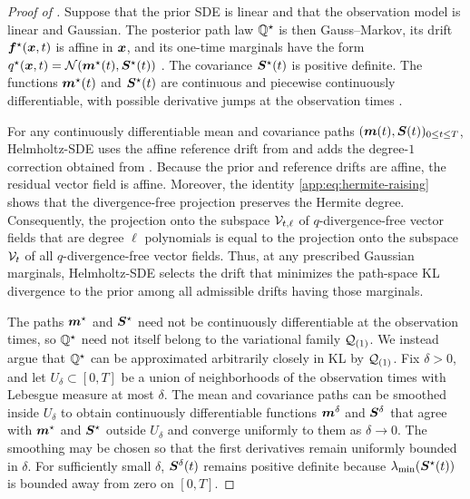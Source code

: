 \begin{proof}[Proof of ]
Suppose that the prior SDE is linear and that the observation model is linear and Gaussian.
The posterior path law $\mathbb{Q}^\star$ is then Gauss--Markov, its drift $\boldsymbol{f}^\star(\boldsymbol{x},t)$ is affine in $\boldsymbol{x}$, and its one-time marginals have the form $q^\star(\boldsymbol{x},t)=\mathcal{N}(\boldsymbol{m}^\star(t),\boldsymbol{S}^\star(t))$ \citep{kalman1961new,sarkka2023bayesian}.
The covariance $\boldsymbol{S}^\star(t)$ is positive definite.
The functions $\boldsymbol{m}^\star(t)$ and $\boldsymbol{S}^\star(t)$ are continuous and piecewise continuously differentiable, with possible derivative jumps at the observation times \citep[Appendix J]{hu2025sing}.

For any continuously differentiable mean and covariance paths $(\boldsymbol{m}(t),\boldsymbol{S}(t))_{0\leq t\leq T}$, Helmholtz-SDE uses the affine reference drift from  and adds the degree-$1$ correction obtained from .
Because the prior and reference drifts are affine, the residual vector field is affine.
Moreover, the identity \cref{app:eq:hermite-raising} shows that the divergence-free projection preserves the Hermite degree.
Consequently, the projection onto the subspace $\mathcal{V}_{t, \ell}$ of $q$-divergence-free vector fields that are degree $\ell$ polynomials is equal to the projection onto the subspace $\mathcal{V}_t$ of all $q$-divergence-free vector fields.
Thus, at any prescribed Gaussian marginals, Helmholtz-SDE selects the drift that minimizes the path-space KL divergence to the prior among all admissible drifts having those marginals.

The paths $\boldsymbol{m}^\star$ and $\boldsymbol{S}^\star$ need not be continuously differentiable at the observation times, so $\mathbb{Q}^\star$ need not itself belong to the variational family $\mathcal{Q}_{(1)}$.
We instead argue that $\mathbb{Q}^\star$ can be approximated arbitrarily closely in KL by $\mathcal{Q}_{(1)}$.
Fix $\delta>0$, and let $U_\delta\subset[0,T]$ be a union of neighborhoods of the observation times with Lebesgue measure at most $\delta$.
The mean and covariance paths can be smoothed inside $U_\delta$ to obtain continuously differentiable functions $\boldsymbol{m}^\delta$ and $\boldsymbol{S}^\delta$ that agree with $\boldsymbol{m}^\star$ and $\boldsymbol{S}^\star$ outside $U_\delta$ and converge uniformly to them as $\delta \to 0$.
The smoothing may be chosen so that the first derivatives remain uniformly bounded in $\delta$.
For sufficiently small $\delta$, $\boldsymbol{S}^\delta(t)$ remains positive definite because $\lambda_{\min}(\boldsymbol{S}^\star(t))$ is bounded away from zero on $[0,T]$.


\end{proof}
